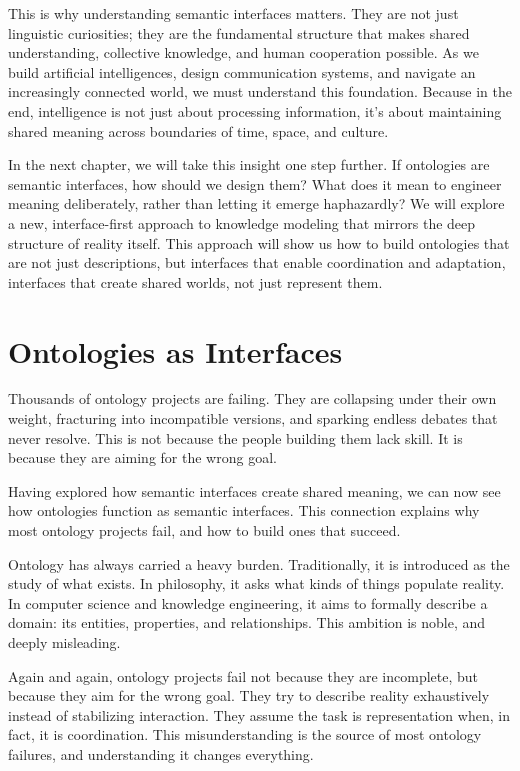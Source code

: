 \documentclass[
  openright]{book}
\begin{document}
This is why understanding semantic interfaces matters. They are not just
linguistic curiosities; they are the fundamental structure that makes
shared understanding, collective knowledge, and human cooperation
possible. As we build artificial intelligences, design communication
systems, and navigate an increasingly connected world, we must
understand this foundation. Because in the end, intelligence is not just
about processing information, it's about maintaining shared meaning
across boundaries of time, space, and culture.

In the next chapter, we will take this insight one step further. If
ontologies are semantic interfaces, how should we design them? What does
it mean to engineer meaning deliberately, rather than letting it emerge
haphazardly? We will explore a new, interface-first approach to
knowledge modeling that mirrors the deep structure of reality itself.
This approach will show us how to build ontologies that are not just
descriptions, but interfaces that enable coordination and adaptation,
interfaces that create shared worlds, not just represent them.

\chapter{\texorpdfstring{Ontologies as
Interfaces}{Ontologies as Interfaces}}\label{ontologies-as-interfaces}

Thousands of ontology projects are failing. They are collapsing under
their own weight, fracturing into incompatible versions, and sparking
endless debates that never resolve. This is not because the people
building them lack skill. It is because they are aiming for the wrong
goal.

Having explored how semantic interfaces create shared meaning, we can
now see how ontologies function as semantic interfaces. This connection
explains why most ontology projects fail, and how to build ones that
succeed.

Ontology has always carried a heavy burden. Traditionally, it is
introduced as the study of what exists. In philosophy, it asks what
kinds of things populate reality. In computer science and knowledge
engineering, it aims to formally describe a domain: its entities,
properties, and relationships. This ambition is noble, and deeply
misleading.

Again and again, ontology projects fail not because they are incomplete,
but because they aim for the wrong goal. They try to describe reality
exhaustively instead of stabilizing interaction. They assume the task is
representation when, in fact, it is coordination. This misunderstanding
is the source of most ontology failures, and understanding it changes
everything.
\end{document}
